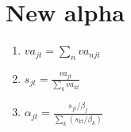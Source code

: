 \documentclass[12pt]{article}
\begin{document}
\thispagestyle{empty}

\section{New alpha}

\begin{enumerate}
	\item $va_{jt} = \sum_n va_{njt}$
	\item $s_{jt} = \frac{va_{jt}}{\sum_k va_{kt}}$
	\item $\alpha_{jt} = \frac{s_{jt} / \beta_j}{\sum_k (s_{kt} / \beta_k)}$
\end{enumerate}
\end{document}
